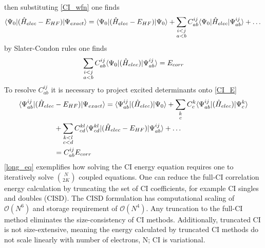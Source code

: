       then substituting \cref{CI_wfn} one finds
        \begin{equation}
        \langle\Psi_0 |(\hat{H}_{elec} - E_{HF})| \Psi_{exact} \rangle = \langle\Psi_0 |(\hat{H}_{elec} - E_{HF})| \Psi_0 \rangle + \sum_{\substack{i<j \\ a<b}}C^{ij}_{ab}\langle\Psi_0 |\hat{H}_{elec}| \Psi^{ij}_{ab} \rangle + \dots
        \end{equation}
      by Slater-Condon rules one finds
        \begin{equation}
        \sum_{\substack{i<j \\ a<b}}C^{ij}_{ab}\langle\Psi_0 |(\hat{H}_{elec})| \Psi^{ij}_{ab} \rangle  = E_{corr}
        \end{equation}
      To resolve $C^{ij}_{ab}$ it is necessary to project excited determinants onto \cref{CI_E}
        \begin{equation}\label{long_eq}
        	\begin{aligned}
        		\langle\Psi^{ij}_{ab} |(\hat{H}_{elec} &- E_{HF})| \Psi_{exact} \rangle = \langle\Psi^{ij}_{ab} |(\hat{H}_{elec} )| \Psi_0 \rangle +  \sum_{\substack{k\\c}} C^k_c\langle\Psi^{ij}_{ab} |(\hat{H}_{elec} )| \Psi^k_c \rangle \\
      		&+  \sum_{\substack{k<l \\ c<d}}C^{kl}_{cd}\langle\Psi^{kl}_{cd} |(\hat{H}_{elec}-E_{HF})| \Psi^{ij}_{ab} \rangle  +\dots\\
          	&= C^{ij}_{ab}E_{corr}
        	\end{aligned}
        \end{equation}
      \cref{long_eq} exemplifies how solving the CI energy equation requires one to iteratively solve $\binom{N}{2K}$ coupled equations.  
      One can reduce the full-CI correlation energy calculation by truncating the set of CI coefficients, for example CI singles and doubles (CISD).  
      The CISD formulation has computational scaling of $\mathcal{O}(N^6)$ and storage requirement of $\mathcal{O}(N^4)$.  Any truncation to the full-CI method eliminates the size-consistency of CI methods.  Additionally, truncated CI is not size-extensive, meaning the energy calculated by truncated CI methods do not scale linearly with number of electrons, N; CI is variational.

